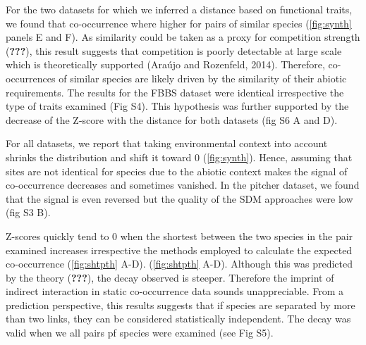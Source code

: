 For the two datasets for which we inferred a distance based on
functional traits, we found that co-occurrence where higher for pairs of
similar species (\ref{fig:synth} panels E and F). As similarity could be
taken as a proxy for competition strength ({\textbf{???}}), this result
suggests that competition is poorly detectable at large scale which is
theoretically supported (Araújo and Rozenfeld, 2014). Therefore,
co-occurrences of similar species are likely driven by the similarity of
their abiotic requirements. The results for the FBBS dataset were
identical irrespective the type of traits examined (Fig S4). This
hypothesis was further supported by the decrease of the Z-score with the
distance for both datasets (fig S6 A and D).

For all datasets, we report that taking environmental context into
account shrinks the distribution and shift it toward 0
(\ref{fig:synth}). Hence, assuming that sites are not identical for
species due to the abiotic context makes the signal of co-occurrence
decreases and sometimes vanished. In the pitcher dataset, we found that
the signal is even reversed but the quality of the SDM approaches were
low (fig S3 B).

Z-scores quickly tend to 0 when the shortest between the two species in
the pair examined increases irrespective the methods employed to
calculate the expected co-occurrence (\ref{fig:shtpth} A-D).
(\ref{fig:shtpth} A-D). Although this was predicted by the theory
({\textbf{???}}), the decay observed is steeper. Therefore the imprint
of indirect interaction in static co-occurrence data sounds
unappreciable. From a prediction perspective, this results suggests that
if species are separated by more than two links, they can be considered
statistically independent. The decay was valid when we all pairs pf
species were examined (see Fig S5).

